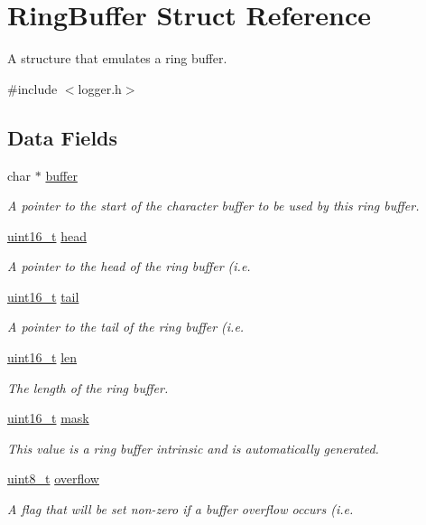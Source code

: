 \hypertarget{structRingBuffer}{\section{Ring\-Buffer Struct Reference}
\label{structRingBuffer}
}


A structure that emulates a ring buffer.  




{\ttfamily \#include $<$logger.\-h$>$}

\subsection*{Data Fields}
\begin{DoxyCompactItemize}
\item 
char $\ast$ \hyperlink{group__logger_gaab96a16b4002b0b6c5a633f04116fb26}{buffer}
\begin{DoxyCompactList}\small\item\em A pointer to the start of the character buffer to be used by this ring buffer. \end{DoxyCompactList}\item 
\hyperlink{typedefs_8h_a1f1825b69244eb3ad2c7165ddc99c956}{uint16\-\_\-t} \hyperlink{group__logger_gad94cc79525f7d91b1f94cc727fdf1b62}{head}
\begin{DoxyCompactList}\small\item\em A pointer to the head of the ring buffer (i.\-e. \end{DoxyCompactList}\item 
\hyperlink{typedefs_8h_a1f1825b69244eb3ad2c7165ddc99c956}{uint16\-\_\-t} \hyperlink{group__logger_gabc28ed906fd4e664a996837fbe379af6}{tail}
\begin{DoxyCompactList}\small\item\em A pointer to the tail of the ring buffer (i.\-e. \end{DoxyCompactList}\item 
\hyperlink{typedefs_8h_a1f1825b69244eb3ad2c7165ddc99c956}{uint16\-\_\-t} \hyperlink{group__logger_ga850aaa0b65cb42a57574ff1aba2b785d}{len}
\begin{DoxyCompactList}\small\item\em The length of the ring buffer. \end{DoxyCompactList}\item 
\hyperlink{typedefs_8h_a1f1825b69244eb3ad2c7165ddc99c956}{uint16\-\_\-t} \hyperlink{group__logger_ga005412793d732ac49515837fbb182f3d}{mask}
\begin{DoxyCompactList}\small\item\em This value is a ring buffer intrinsic and is automatically generated. \end{DoxyCompactList}\item 
\hyperlink{typedefs_8h_aba7bc1797add20fe3efdf37ced1182c5}{uint8\-\_\-t} \hyperlink{group__logger_ga94b379854b10359da1ed98113634130e}{overflow}
\begin{DoxyCompactList}\small\item\em A flag that will be set non-\/zero if a buffer overflow occurs (i.\-e. \end{DoxyCompactList}\end{DoxyCompactItemize}


